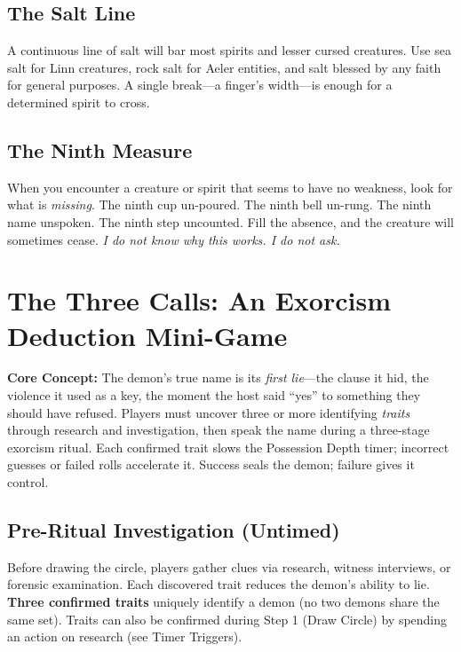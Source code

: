 \subsection{The Salt Line}

A continuous line of salt will bar most spirits and lesser cursed creatures. Use sea salt for Linn creatures, rock salt for Aeler entities, and salt blessed by any faith for general purposes. A single break---a finger's width---is enough for a determined spirit to cross.

\subsection{The Ninth Measure}

When you encounter a creature or spirit that seems to have no weakness, look for what is \emph{missing}. The ninth cup un-poured. The ninth bell un-rung. The ninth name unspoken. The ninth step uncounted. Fill the absence, and the creature will sometimes cease. \emph{I do not know why this works. I do not ask.}

\clearpage
\section*{The Three Calls: An Exorcism Deduction Mini-Game}
\noindent\textcolor{witnessSilver}{\titlerule[0.8pt]}
\vspace{0.3em}

\noindent\textbf{Core Concept:} The demon's true name is its \textit{first lie}---the clause it hid, the violence it used as a key, the moment the host said ``yes'' to something they should have refused. Players must uncover three or more identifying \textit{traits} through research and investigation, then speak the name during a three-stage exorcism ritual. Each confirmed trait slows the Possession Depth timer; incorrect guesses or failed rolls accelerate it. Success seals the demon; failure gives it control.

\subsection*{Pre-Ritual Investigation (Untimed)}
Before drawing the circle, players gather clues via research, witness interviews, or forensic examination. Each discovered trait reduces the demon's ability to lie. \textbf{Three confirmed traits} uniquely identify a demon (no two demons share the same set). Traits can also be confirmed during Step 1 (Draw Circle) by spending an action on research (see Timer Triggers).

